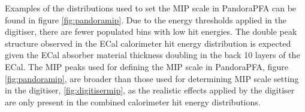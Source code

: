 Examples of the distributions used to set the MIP scale in PandoraPFA can be found in figure \ref{fig:pandoramip}.  Due to the energy thresholds applied in the digitiser, there are fewer populated bins with low hit energies.  The double peak structure observed in the ECal calorimeter hit energy distribution is expected given the ECal absorber material thickness doubling in the back 10 layers of the ECal.  The MIP peaks used for defining the MIP scale in PandoraPFA, figure \ref{fig:pandoramip}, are broader than those used for determining MIP scale setting in the digitiser, \ref{fig:digitisermip}, as the realistic effects applied by the digitiser are only present in the combined calorimeter hit energy distributions.  

\begin{figure}[h!]
 \\

\end{figure}
